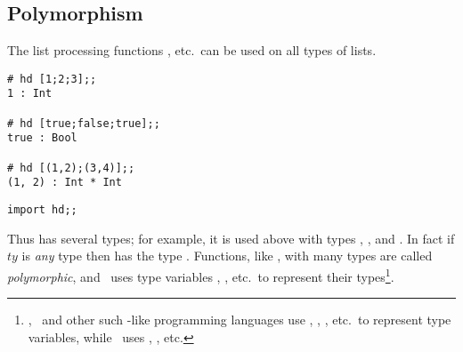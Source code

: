 \documentclass[11pt]{article}
\begin{document}






\subsection {Polymorphism}

The list processing functions ,
 etc.\ can be used on all types of lists.

\begin{session}
\emlsession
\begin{verbatim}
# hd [1;2;3];;
1 : Int

# hd [true;false;true];;
true : Bool

# hd [(1,2);(3,4)];;
(1, 2) : Int * Int
\end{verbatim}
\emlfile
\begin{verbatim}
import hd;;
\end{verbatim}
\emlend
\end{session}


\noindent
Thus  has several types; for example, it is used above with types
,
\linebreak
{}, and .  In fact
if $ty$ is {\it any} type then  has the type .
Functions, like , with many types are called {\em polymorphic\/}, and
\ML\ uses type variables
, ,  etc.\ to represent their
types\footnote{\EML, \SML\ and other such \ML-like programming
  languages use , , , etc.\ to represent type
  variables, while \CML\ uses \TTD{*}, \TTD{**}, \TTD{***} etc.}.
\end{document}
